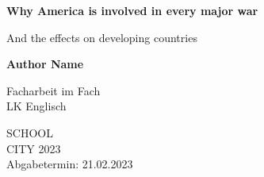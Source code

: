 \begin{center}
	{
		\vspace*{1cm}
		
		\Huge
		\textbf{Why America is involved in every major war}
		
		\vspace{0.5cm}
		\LARGE
		And the effects on developing countries
		
		\vspace{1.5cm}
		
		\textbf{Author Name}
		
		\vspace{1.5cm}
		
		Facharbeit im Fach\\
		LK Englisch
		
		\vfill
		\Large
		SCHOOL\\
		CITY 2023\\
		Abgabetermin: 21.02.2023
	}
\end{center}